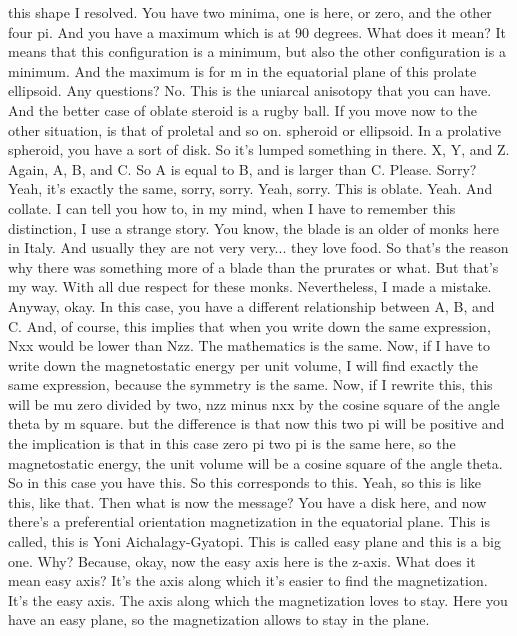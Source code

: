 this shape I resolved. You have two minima, one is here, or zero, and the other four pi. And you have a maximum which is at 90 degrees. What does it mean? It means that this configuration is a minimum, but also the other configuration is a minimum. And the maximum is for m in the equatorial plane of this prolate ellipsoid. Any questions? No. This is the uniarcal anisotopy that you can have. And the better case of oblate steroid is a rugby ball. If you move now to the other situation, is that of proletal and so on. spheroid or ellipsoid. In a prolative spheroid, you have a sort of disk. So it's lumped something in there. X, Y, and Z. Again, A, B, and C. So A is equal to B, and is larger than C. Please. Sorry? Yeah, it's exactly the same, sorry, sorry. Yeah, sorry. This is oblate. Yeah. And collate. I can tell you how to, in my mind, when I have to remember this distinction, I use a strange story. You know, the blade is an older of monks here in Italy. And usually they are not very very... they love food. So that's the reason why there was something more of a blade than the prurates or what. But that's my way. With all due respect for these monks. Nevertheless, I made a mistake. Anyway, okay. In this case, you have a different relationship between A, B, and C. And, of course, this implies that when you write down the same expression, Nxx would be lower than Nzz. The mathematics is the same. Now, if I have to write down the magnetostatic energy per unit volume, I will find exactly the same expression, because the symmetry is the same. Now, if I rewrite this, this will be mu zero divided by two, nzz minus nxx by the cosine square of the angle theta by m square. but the difference is that now this two pi will be positive and the implication is that in this case zero pi two pi is the same here, so the magnetostatic energy, the unit volume will be a cosine square of the angle theta. So in this case you have this. So this corresponds to this. Yeah, so this is like this, like that. Then what is now the message? You have a disk here, and now there's a preferential orientation magnetization in the equatorial plane. This is called, this is Yoni Aichalagy-Gyatopi. This is called easy plane and this is a big one. Why? Because, okay, now the easy axis here is the z-axis. What does it mean easy axis? It's the axis along which it's easier to find the magnetization. It's the easy axis. The axis along which the magnetization loves to stay. Here you have an easy plane, so the magnetization allows to stay in the plane.
